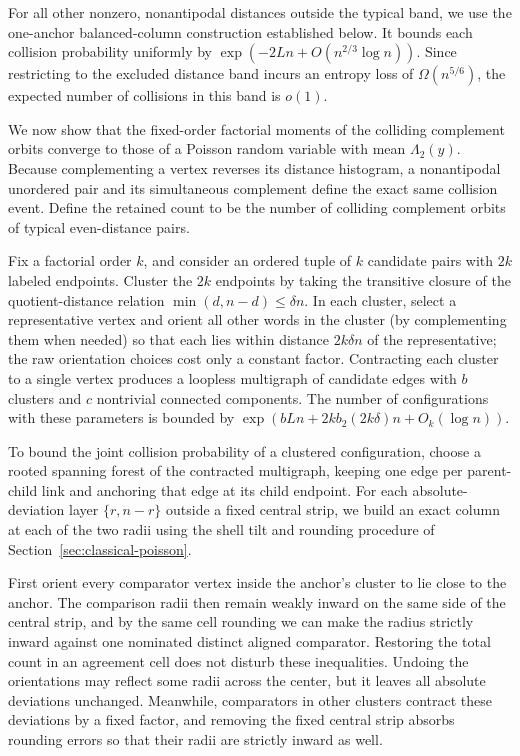For all other nonzero, nonantipodal distances outside the typical band, we use the one-anchor balanced-column construction established below. It bounds each collision probability uniformly by \(\exp(-2Ln+O(n^{2/3}\log n))\). Since restricting to the excluded distance band incurs an entropy loss of \(\Omega(n^{5/6})\), the expected number of collisions in this band is \(o(1)\).

We now show that the fixed-order factorial moments of the colliding complement orbits converge to those of a Poisson random variable with mean \(\Lambda_2(y)\). Because complementing a vertex reverses its distance histogram, a nonantipodal unordered pair and its simultaneous complement define the exact same collision event. Define the retained count to be the number of colliding complement orbits of typical even-distance pairs.

Fix a factorial order \(k\), and consider an ordered tuple of \(k\) candidate pairs with \(2k\) labeled endpoints. Cluster the \(2k\) endpoints by taking the transitive closure of the quotient-distance relation \(\min(d,n-d)\le\delta n\). In each cluster, select a representative vertex and orient all other words in the cluster (by complementing them when needed) so that each lies within distance \(2k\delta n\) of the representative; the raw orientation choices cost only a constant factor. Contracting each cluster to a single vertex produces a loopless multigraph of candidate edges with \(b\) clusters and \(c\) nontrivial connected components. The number of configurations with these parameters is bounded by \(\exp(bLn+2k b_2(2k\delta)n+O_k(\log n))\).

To bound the joint collision probability of a clustered configuration, choose a rooted spanning forest of the contracted multigraph, keeping one edge per parent-child link and anchoring that edge at its child endpoint. For each absolute-deviation layer \(\{r,n-r\}\) outside a fixed central strip, we build an exact column at each of the two radii using the shell tilt and rounding procedure of Section~\ref{sec:classical-poisson}.

First orient every comparator vertex inside the anchor's cluster to lie close to the anchor. The comparison radii then remain weakly inward on the same side of the central strip, and by the same cell rounding we can make the radius strictly inward against one nominated distinct aligned comparator. Restoring the total count in an agreement cell does not disturb these inequalities. Undoing the orientations may reflect some radii across the center, but it leaves all absolute deviations unchanged. Meanwhile, comparators in other clusters contract these deviations by a fixed factor, and removing the fixed central strip absorbs rounding errors so that their radii are strictly inward as well.


